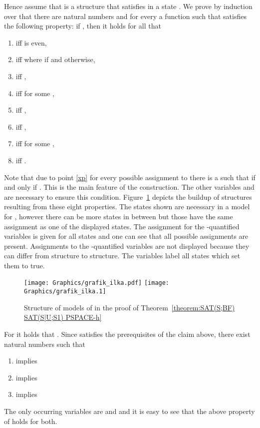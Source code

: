         Hence assume that  is a structure that satisfies  in a state . We prove by induction over  that there are natural numbers  and for every  a function  such that  satisfies the following property: if , then it holds for all  that


        \begin{enumerate}[(1)]
\item\label{xp}   iff   is even,
          \item\label{xq}   iff   where  if  and  otherwise,
\item       iff  ,
          \item   iff   for some ,\
          \item   iff  ,
          \item       iff  ,
          \item   iff   for some ,
          \item   iff  .
        \end{enumerate}

	Note that due to point \ref{xp} for every possible assignment  to  there is a  such that  if and only if . This is the main feature of the construction. The other variables  and  are necessary to ensure this condition. Figure~\ref{figure: structure} depicts the buildup of structures resulting from these eight properties. The states shown are necessary in a model for , however there can be more states in between but those have the same assignment as one of the displayed states. The assignment for the -quantified variables  is given for all states and one can see that all possible assignments are present. Assignments to the -quantified variables are not displayed because they can differ from structure to structure. The variables  label all states which set them to true.

\begin{figure}
\begin{center}
  \ifpdf
    \texttt{[image: Graphics/grafik\_ilka.pdf]}
  \else
    \texttt{[image: Graphics/grafik\_ilka.1]}
  \fi
\caption{Structure of models of  in the proof of Theorem~\ref{theorem:SAT(S;BF) SAT(S|U;S1) PSPACE-h}}\label{figure: structure}
\end{center}
\end{figure}



        For  it holds that . Since  satisfies the prerequisites of the claim above, there exist natural numbers  such that
        \begin{enumerate}[]
\item  implies 
          \item  implies 
	  \item  implies 
        \end{enumerate}
        The only occurring variables are  and  and it is easy to see that the above property of  holds for both.

